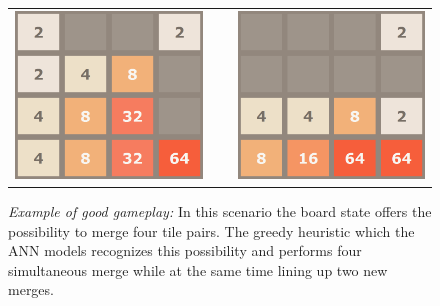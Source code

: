 \begin{figure}[!h]
\centering
\begin{tabularx}{\textwidth}{cXc}
\includegraphics[scale=0.35]{good_1} & ~ & \includegraphics[scale=0.35]{good_2} \\
\end{tabularx}
\caption{\textit{Example of good gameplay:} In this scenario the board state offers the possibility to merge four tile pairs. The greedy heuristic which the \ac{ANN} models recognizes this possibility and performs four simultaneous merge while at the same time lining up two new merges.}
\label{fig:N1}
\end{figure}



